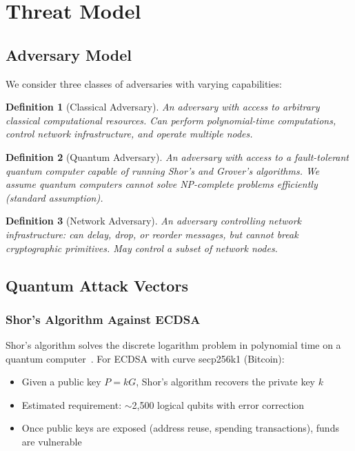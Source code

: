 \documentclass[11pt,a4paper]{article}
\newtheorem{definition}{Definition}
\begin{document}
\section{Threat Model}

\subsection{Adversary Model}

We consider three classes of adversaries with varying capabilities:

\begin{definition}[Classical Adversary]
An adversary with access to arbitrary classical computational resources. Can perform polynomial-time computations, control network infrastructure, and operate multiple nodes.
\end{definition}

\begin{definition}[Quantum Adversary]
An adversary with access to a fault-tolerant quantum computer capable of running Shor's and Grover's algorithms. We assume quantum computers cannot solve NP-complete problems efficiently (standard assumption).
\end{definition}

\begin{definition}[Network Adversary]
An adversary controlling network infrastructure: can delay, drop, or reorder messages, but cannot break cryptographic primitives. May control a subset of network nodes.
\end{definition}

\subsection{Quantum Attack Vectors}

\subsubsection{Shor's Algorithm Against ECDSA}

Shor's algorithm solves the discrete logarithm problem in polynomial time on a quantum computer~\cite{shor1994}. For ECDSA with curve secp256k1 (Bitcoin):

\begin{itemize}
    \item Given a public key $P = kG$, Shor's algorithm recovers the private key $k$
    \item Estimated requirement: $\sim$2,500 logical qubits with error correction~\cite{gidney2021}
    \item Once public keys are exposed (address reuse, spending transactions), funds are vulnerable
\end{itemize}
\end{document}
